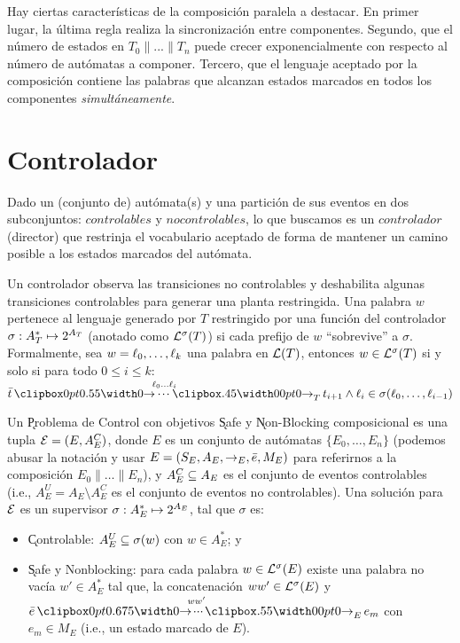 Hay ciertas características de la composición paralela a destacar. En primer lugar, la última regla realiza la sincronización entre componentes. Segundo, que el número de estados en $T_0 \| ... \| T_n$ puede crecer exponencialmente con respecto al número de autómatas a componer. Tercero, que el lenguaje aceptado por la composición contiene las palabras que alcanzan estados marcados en todos los componentes \textit{simultáneamente}.

\section{Controlador}

Dado un (conjunto de) autómata(s) y una partición de sus eventos en dos subconjuntos: $controlables$ y $no controlables$, lo que buscamos es un $controlador$ (director) que restrinja el vocabulario aceptado de forma de mantener un camino posible a los estados marcados del autómata.

Un controlador observa las transiciones no controlables y deshabilita algunas transiciones controlables para generar una planta restringida. Una palabra $w$ pertenece al lenguaje generado por $T$ restringido por una función del controlador $\sigma : A_T^* \mapsto 2^{A_T}$ (anotado como $\mathcal{L}^\sigma(T)$) si cada prefijo de $w$ ``sobrevive'' a $\sigma$.
Formalmente, sea $w = \ell_0,\ldots,\ell_k$ una palabra en $\mathcal{L}(T)$, entonces $w \in \mathcal{L}^\sigma(T)$ si y solo si para todo $0 \leq i \leq k$:
$
\init{t} \run{\,\l_0}{\l_i}{T} t_{i+1} \wedge \l_i \in \sigma(\l_0,\ldots,\l_{i-1})
$

\begin{definition} \label{def:control-problem}
	Un \k{Problema de Control} con objetivos \k{Safe} y \k{Non-Blocking} composicional es una tupla $\mathcal{E} = (E, A_E^C)$, donde $E$ es un conjunto de autómatas $\{E_0,\ldots,E_n\}$ (podemos abusar la notación y usar $E = (S_E,A_E,\rightarrow_E,\bar{e},M_E)$ para referirnos a la composición $E_0\|\ldots\|E_n$), y $A_E^C \subseteq A_E$ es el conjunto de eventos controlables (i.e., $A_E^U = A_E \setminus A_E^C$ es el conjunto de eventos no controlables).
	Una solución para $\mathcal{E}$ es un supervisor $\sigma : A_E^* \mapsto 2^{A_E}$, tal que $\sigma$ es:
	\begin{itemize}[itemsep=4pt,topsep=-8pt]
		
		\item \k{Controlable}: $A_E^U \subseteq \sigma(w)$ con $w \in A_E^*$; y
		
		\item \k{Safe y Nonblocking}: para cada palabra $w \in \mathcal{L}^\sigma(E)$ existe una palabra no vacía $w' \in A_E^*$ tal que, la concatenación $ww' \in \mathcal{L}^\sigma(E)$ y $\init{e} \runw{\;ww'}{E} e_m$ con $e_m \in M_E$ (i.e., un estado marcado de $E$).
		
	\end{itemize}
	
\end{definition}

